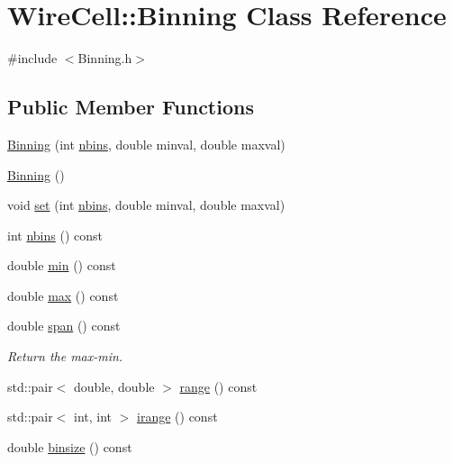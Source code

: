 \hypertarget{class_wire_cell_1_1_binning}{}\section{Wire\+Cell\+:\+:Binning Class Reference}
\label{class_wire_cell_1_1_binning}


{\ttfamily \#include $<$Binning.\+h$>$}

\subsection*{Public Member Functions}
\begin{DoxyCompactItemize}
\item 
\hyperlink{class_wire_cell_1_1_binning_a76d15fa7ac7d60e63f7d77c28f2acac8}{Binning} (int \hyperlink{class_wire_cell_1_1_binning_aaac66033ecc76a899c18f8f09404c419}{nbins}, double minval, double maxval)
\item 
\hyperlink{class_wire_cell_1_1_binning_add55162797f4c84f66397821289dbc0e}{Binning} ()
\item 
void \hyperlink{class_wire_cell_1_1_binning_a6bbcf5f258e115803cbd83cb25f839d4}{set} (int \hyperlink{class_wire_cell_1_1_binning_aaac66033ecc76a899c18f8f09404c419}{nbins}, double minval, double maxval)
\item 
int \hyperlink{class_wire_cell_1_1_binning_aaac66033ecc76a899c18f8f09404c419}{nbins} () const
\item 
double \hyperlink{class_wire_cell_1_1_binning_a5c7eadf5a87f443a18b93d18f1707372}{min} () const
\item 
double \hyperlink{class_wire_cell_1_1_binning_a91e6fb550bd6cac95e1e61be625583fe}{max} () const
\item 
double \hyperlink{class_wire_cell_1_1_binning_ad89e1175b26214dc7fda52ee7e47db3e}{span} () const
\begin{DoxyCompactList}\small\item\em Return the max-\/min. \end{DoxyCompactList}\item 
std\+::pair$<$ double, double $>$ \hyperlink{class_wire_cell_1_1_binning_a978a1bd9f17264316b5419f5ea5e3253}{range} () const
\item 
std\+::pair$<$ int, int $>$ \hyperlink{class_wire_cell_1_1_binning_ac3c24a2ebbe3c1db7f109b8cf1a69446}{irange} () const
\item 
double \hyperlink{class_wire_cell_1_1_binning_a55ba6a476ed35f5954fd44214e85dbb9}{binsize} () const

\end{DoxyCompactItemize}
